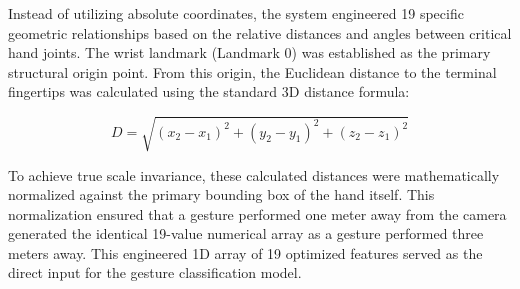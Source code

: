 Instead of utilizing absolute coordinates, the system engineered 19 specific geometric relationships based on the relative distances and angles between critical hand joints. The wrist landmark (Landmark 0) was established as the primary structural origin point. From this origin, the Euclidean distance to the terminal fingertips was calculated using the standard 3D distance formula:

\begin{equation}
D = \sqrt{(x_2 - x_1)^2 + (y_2 - y_1)^2 + (z_2 - z_1)^2}
\end{equation}

To achieve true scale invariance, these calculated distances were mathematically normalized against the primary bounding box of the hand itself. This normalization ensured that a gesture performed one meter away from the camera generated the identical 19-value numerical array as a gesture performed three meters away. This engineered 1D array of 19 optimized features served as the direct input for the gesture classification model.

